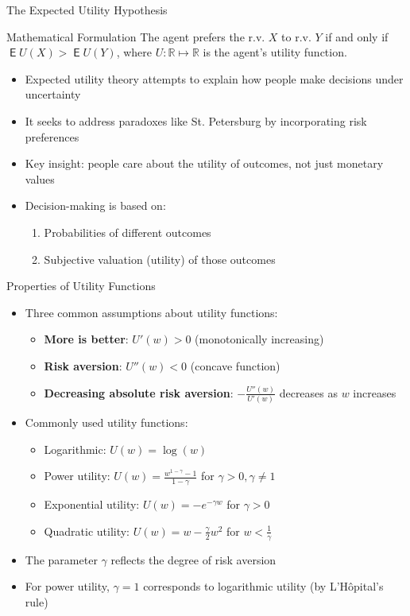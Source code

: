 \documentclass[10pt]{beamer}
\DeclareMathOperator\expc{\mathsf{E}}
\newcommand{\RR}{\mathbb R}
\begin{document}
\begin{frame}{The Expected Utility Hypothesis}
  \begin{block}{Mathematical Formulation}
    The agent prefers the r.v. $X$ to r.v. $Y$ if and only if $\expc U(X) > \expc U(Y)$, where $U:\RR\mapsto\RR$ is the agent's utility function.
  \end{block}
  \vspace{3mm}
  \onslide<+-> 
  \begin{itemize}[<+->]
    \item Expected utility theory attempts to explain how people make decisions under uncertainty
    \item It seeks to address paradoxes like St. Petersburg by incorporating risk preferences
    \item Key insight: people care about the utility of outcomes, not just monetary values
    \item Decision-making is based on:
      \begin{enumerate}
        \item Probabilities of different outcomes
        \item Subjective valuation (utility) of those outcomes
      \end{enumerate}
  \end{itemize}
\end{frame}

\begin{frame}{Properties of Utility Functions}
  \begin{itemize}[<+->]
    \item Three common assumptions about utility functions:
      \begin{itemize}
        \item \textbf{More is better}: $U'(w) > 0$ (monotonically increasing)
        \item \textbf{Risk aversion}: $U''(w) < 0$ (concave function)
        \item \textbf{Decreasing absolute risk aversion}: $-\frac{U''(w)}{U'(w)}$ decreases as $w$ increases
      \end{itemize}
    \item Commonly used utility functions:
      \begin{itemize}
        \item Logarithmic: $U(w) = \log(w)$
        \item Power utility: $U(w) = \frac{w^{1-\gamma} - 1}{1-\gamma}$ for $\gamma > 0, \gamma \neq 1$
        \item Exponential utility: $U(w) = -e^{-\gamma w}$ for $\gamma > 0$
        \item Quadratic utility: $U(w) = w - \frac{\gamma}{2}w^2$ for $w < \frac{1}{\gamma}$
      \end{itemize}
    \item The parameter $\gamma$ reflects the degree of risk aversion
    \item For power utility, $\gamma = 1$ corresponds to logarithmic utility (by L'Hôpital's rule)
  \end{itemize}
\end{frame}
\end{document}
